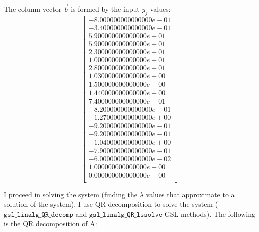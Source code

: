 \documentclass{article}
\newcommand{\code}{\texttt}
\begin{document}
The column vector $\vec{b}$ is formed by the input $y_j$ values:
$$
\begin{bmatrix} 
-8.000000000000000e-01\\
-3.400000000000000e-01\\
5.900000000000000e-01\\
5.900000000000000e-01\\
2.300000000000000e-01\\
1.000000000000000e-01\\
2.800000000000000e-01\\
1.030000000000000e+00\\
1.500000000000000e+00\\
1.440000000000000e+00\\
7.400000000000000e-01\\
-8.200000000000000e-01\\
-1.270000000000000e+00\\
-9.200000000000000e-01\\
-9.200000000000000e-01\\
-1.040000000000000e+00\\
-7.900000000000000e-01\\
-6.000000000000000e-02\\
1.000000000000000e+00\\
0.000000000000000e+00\\
\end{bmatrix}
$$

I proceed in solving the system (finding the $\lambda$ values that approximate to a solution of the system). I use QR decomposition to solve the system ($\code{gsl\_linalg\_QR\_decomp}$ and $\code{gsl\_linalg\_QR\_lssolve}$ GSL methods). The following is the QR decomposition of A:
\end{document}
